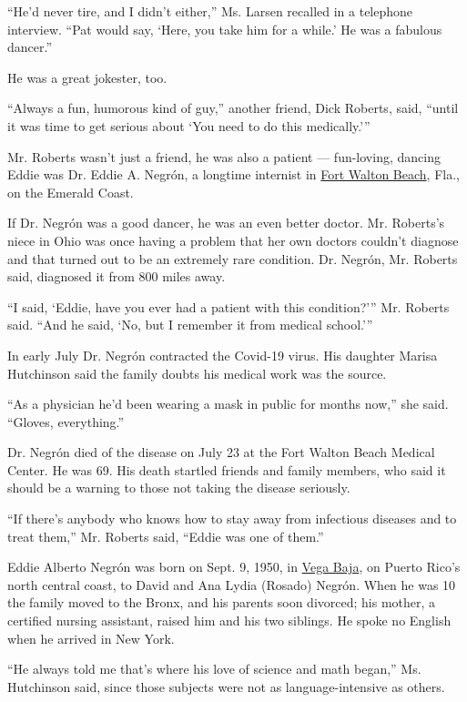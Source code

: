 ``He'd never tire, and I didn't either,'' Ms. Larsen recalled in a
telephone interview. ``Pat would say, `Here, you take him for a while.'
He was a fabulous dancer.''

He was a great jokester, too.

``Always a fun, humorous kind of guy,'' another friend, Dick Roberts,
said, ``until it was time to get serious about `You need to do this
medically.'''

Mr. Roberts wasn't just a friend, he was also a patient --- fun-loving,
dancing Eddie was Dr. Eddie A. Negrón, a longtime internist in
\href{https://www.fwb.org/}{Fort Walton Beach}, Fla., on the Emerald
Coast.

If Dr. Negrón was a good dancer, he was an even better doctor. Mr.
Roberts's niece in Ohio was once having a problem that her own doctors
couldn't diagnose and that turned out to be an extremely rare condition.
Dr. Negrón, Mr. Roberts said, diagnosed it from 800 miles away.

``I said, `Eddie, have you ever had a patient with this condition?'''
Mr. Roberts said. ``And he said, `No, but I remember it from medical
school.'''

In early July Dr. Negrón contracted the Covid-19 virus. His daughter
Marisa Hutchinson said the family doubts his medical work was the
source.

``As a physician he'd been wearing a mask in public for months now,''
she said. ``Gloves, everything.''

Dr. Negrón died of the disease on July 23 at the Fort Walton Beach
Medical Center. He was 69. His death startled friends and family
members, who said it should be a warning to those not taking the disease
seriously.

``If there's anybody who knows how to stay away from infectious diseases
and to treat them,'' Mr. Roberts said, ``Eddie was one of them.''

Eddie Alberto Negrón was born on Sept. 9, 1950, in
\href{https://welcome.topuertorico.org/city/vegabaja.shtml}{Vega Baja},
on Puerto Rico's north central coast, to David and Ana Lydia (Rosado)
Negrón. When he was 10 the family moved to the Bronx, and his parents
soon divorced; his mother, a certified nursing assistant, raised him and
his two siblings. He spoke no English when he arrived in New York.

``He always told me that's where his love of science and math began,''
Ms. Hutchinson said, since those subjects were not as language-intensive
as others.

